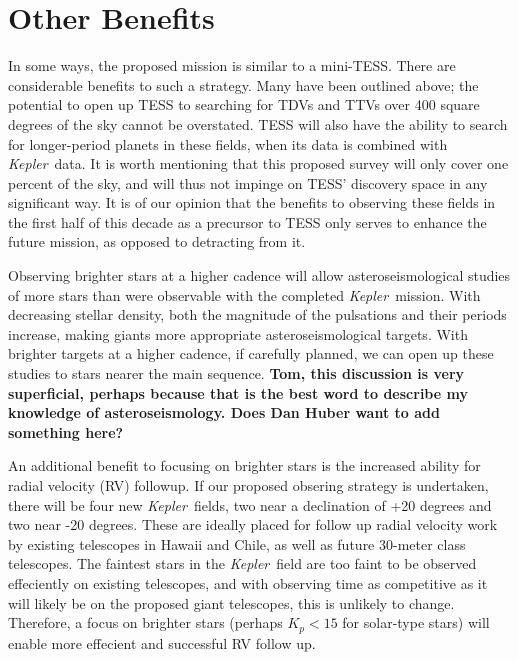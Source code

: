 \documentclass[12pt, preprint]{aastex}
\newcommand{\observatory}[1]{\textsl{#1}}
\newcommand{\kepler}{\observatory{Kepler}}
\newcommand{\Kepler}{\kepler}
\begin{document}
 

\section{Other Benefits}
\label{AS}
In some ways, the proposed mission is similar to a mini-TESS. 
There are considerable benefits to such a strategy. 
Many have been outlined above; the potential to open up TESS to searching for 
 TDVs and TTVs over 400 square degrees of the sky cannot be overstated. 
TESS will also have the ability to search for longer-period planets in these 
 fields, when its data is combined with \Kepler\ data.
It is worth mentioning that this proposed survey will only cover one percent 
 of the sky, and will thus not impinge on TESS' discovery space in any 
 significant way. 
It is of our opinion that the benefits to observing these fields in the 
 first half of this decade as a precursor to TESS only serves to enhance 
 the future mission, as opposed to detracting from it.

Observing brighter stars at a higher cadence will allow asteroseismological 
 studies of more stars than were observable with the completed
  \Kepler\ mission. 
With decreasing stellar density, both the magnitude of the pulsations and 
 their periods increase, making giants more appropriate asteroseismological  
 targets. With brighter targets at a higher cadence, if carefully planned, 
 we can open up these studies to stars nearer the main sequence. \textbf{Tom, 
 this discussion is very superficial, perhaps because that is the best word to 
 describe my knowledge of asteroseismology. Does Dan Huber want to add 
 something here?}

An additional benefit to focusing on brighter stars is the increased ability 
 for radial velocity (RV) followup. 
If our proposed obsering strategy is undertaken, there will
 be four new \Kepler\ fields, two near a declination of +20 degrees and two 
 near -20 degrees. 
These are ideally placed for follow up radial velocity work
 by existing telescopes in Hawaii and Chile, as well as future 30-meter class
 telescopes. 
The faintest stars in the \Kepler\ field are too faint to be observed 
 effeciently on existing telescopes, and with observing time as competitive 
 as it will likely be on the proposed giant telescopes, this is unlikely to 
 change.
Therefore, a focus on brighter stars (perhaps $K_p < 15$ for solar-type stars) 
 will enable more effecient and successful RV follow up.
 
\end{document}
